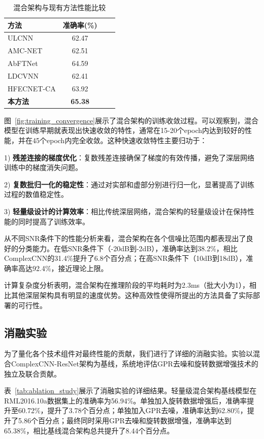 \documentclass[conference]{IEEEtran}
\begin{document}
\begin{table}[h]
\centering
\caption{混合架构与现有方法性能比较}
\label{tab:hybrid_performance}
\begin{tabular}{@{}lccc@{}}
\toprule
方法 & 准确率(\%) \\
\midrule
ULCNN & 62.47 \\
AMC-NET & 62.51 \\
AbFTNet & 64.59 \\
LDCVNN & 62.41 \\
HFECNET-CA & 63.92 \\
\textbf{本方法} & \textbf{65.38} \\
\bottomrule
\end{tabular}
\end{table}

图~\ref{fig:training_convergence}展示了混合架构的训练收敛过程。可以观察到，混合模型在训练早期就表现出快速收敛的特性，通常在15-20个epoch内达到较好的性能，并在45个epoch内完全收敛。这种快速收敛特性主要归功于：

1) \textbf{残差连接的梯度优化}：复数残差连接确保了梯度的有效传播，避免了深层网络训练中的梯度消失问题。

2) \textbf{复数批归一化的稳定性}：通过对实部和虚部分别进行归一化，显著提高了训练过程的数值稳定性。

3) \textbf{轻量级设计的计算效率}：相比传统深层网络，混合架构的轻量级设计在保持性能的同时提高了训练效率。

从不同SNR条件下的性能分析来看，混合架构在各个信噪比范围内都表现出了良好的分类能力。在低SNR条件下（-20dB到-2dB），准确率达到38.2\%，相比ComplexCNN的31.4\%提升了6.8个百分点；在高SNR条件下（10dB到18dB），准确率高达92.4\%，接近理论上限。

计算复杂度分析表明，混合架构在推理阶段的平均耗时为2.3ms（批大小为1），相比其他深层架构具有明显的速度优势。这种高效性使得所提出的方法具备了实际部署的可行性。

\subsection{消融实验}

为了量化各个技术组件对最终性能的贡献，我们进行了详细的消融实验。实验以混合ComplexCNN-ResNet架构为基线，系统地评估GPR去噪和旋转数据增强技术的独立及联合贡献。

表~\ref{tab:ablation_study}展示了消融实验的详细结果。轻量级混合架构基线模型在RML2016.10a数据集上的准确率为56.94\%。单独加入旋转数据增强后，准确率提升至60.72\%，提升了3.78个百分点；单独加入GPR去噪，准确率达到62.80\%，提升了5.86个百分点；最终同时采用GPR去噪和旋转数据增强，准确率达到65.38\%，相比基线混合架构总共提升了8.44个百分点。
\end{document}
